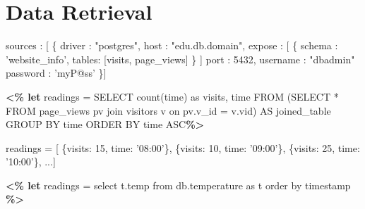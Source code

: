 \section{Data Retrieval}
\label{section:dataretrieval}

\begin{figure*}
\centering
%
%
\begin{minipage}[c]{6cm}
\begin{minipage}[c]{6cm}
\begin{code}
   sources : [ \{ 
     driver   : "postgres", 
     host     : "edu.db.domain", 
     expose   : [ \{
      schema : 'website_info', 
      tables: [visits, page_views] \} ]
     port     : 5432, 
     username : "dbadmin" 
     password : 'myP@ss'
   \}] 
\end{code}
\label{figure:source-config-file}
\end{minipage}
%
\begin{minipage}[c]{6cm}
\begin{code}
\textbf{<\% let} readings = 
   SELECT count(time) as visits, time
   FROM (SELECT * FROM page_views pv 
  	     join visitors v 
         on pv.v_id = v.vid) AS joined_table
   GROUP BY time 
   ORDER BY time ASC\textbf{\%>}
\end{code}
\vspace*{-0.3cm}
\label{figure:running-example:main-template-instance}
\vspace*{0.3cm}
\end{minipage}

\begin{minipage}[c]{6cm}
\begin{code}
readings = [
   \{visits: 15, time: '08:00'\}, 
   \{visits: 10, time: '09:00'\},
   \{visits: 25, time: '10:00'\},  ...]
\end{code}
\vspace*{-0.3cm}
\label{figure:running-example:main-template-instance}
\vspace*{0.3cm}
\end{minipage}
%
\end{minipage}
\hspace{1cm}
\begin{minipage}[c]{8.5cm}
\begin{code}

  \textbf{<\% let} readings = select t.temp
                    from db.temperature as t
                    order by timestamp \textbf{\%>}
  

\end{code}
\end{minipage}
\end{figure*}
